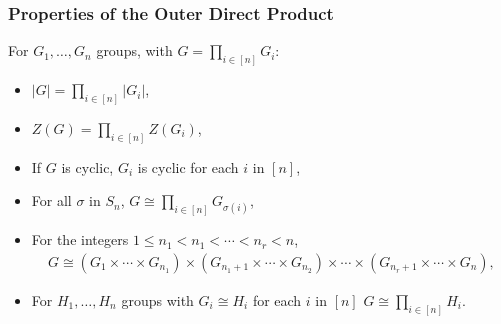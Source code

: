 \subsubsection{Properties of the Outer Direct Product}

For $G_1, \ldots, G_n$ groups, with $G = \prod_{i \in [n]} G_i$: \begin{itemize}
    \item $|G| = \prod_{i \in [n]}|G_i|$,
    \item $Z(G) = \prod_{i \in [n]}Z(G_i)$,
    \item If $G$ is cyclic, $G_i$ is cyclic for each $i$ in $[n]$,
    \item For all $\sigma$ in $S_n$, $G \cong \prod_{i \in [n]} G_{\sigma(i)}$,
    \item For the integers $1 \leq n_1 < n_1 < \cdots < n_r < n$, 
        \begin{gather*}
            G \cong 
            (G_1 \times \cdots \times G_{n_1}) \times 
            (G_{n_1 + 1} \times \cdots \times G_{n_2}) \times \cdots \times
            (G_{n_r + 1} \times \cdots \times G_n),
        \end{gather*}
    \item For $H_1, \ldots, H_n$ groups with $G_i \cong H_i$ for each $i$ in $[n]$
        $G \cong \prod_{i \in [n]} H_i$.
\end{itemize}
